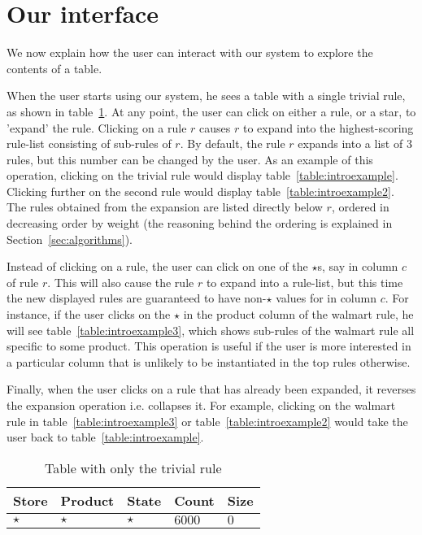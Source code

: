 \documentclass{sig-alternate}
\begin{document}
\section{Our interface}
\label{sec:interface}
We now explain how the user can interact with our system to explore the contents of a table. 

When the user starts using our system, he sees a table with a single trivial rule, as shown in table~\ref{table:trivial}. At any point, the user can click on either a rule, or a star, to 'expand' the rule. Clicking on a rule $r$ causes $r$ to expand into the highest-scoring rule-list consisting of sub-rules of $r$. By default, the rule $r$ expands into a list of $3$ rules, but this number can be changed by the user. As an example of this operation, clicking on the trivial rule would display table~\ref{table:introexample}. Clicking further on the second rule would display table~\ref{table:introexample2}. The rules obtained from the expansion are listed directly below $r$, ordered in decreasing order by weight (the reasoning behind the ordering is explained in Section~\ref{sec:algorithms}).

Instead of clicking on a rule, the user can click on one of the $\star$s, say in column $c$ of rule $r$. This will also cause the rule $r$ to expand into a rule-list, but this time the new displayed rules are guaranteed to have non-$\star$ values for in column $c$. For instance, if the user clicks on the $\star$ in the product column of the walmart rule, he will see table~\ref{table:introexample3}, which shows sub-rules of the walmart rule all specific to some product. This operation is useful if the user is more interested in a particular column that is unlikely to be instantiated in the top rules otherwise. 

Finally, when the user clicks on a rule that has already been expanded, it reverses the expansion operation i.e. collapses it. For example, clicking on the walmart rule in table~\ref{table:introexample3} or table~\ref{table:introexample2} would take the user back to table~\ref{table:introexample}.

\begin{table}
\centering
\begin{tabular}{| l | l | l | l | l |}
\hline Store & Product & State & Count & Size \\
\hline
$\star$ & $\star$ & $\star$ & $6000$ & $0$ \\ \hline
\end{tabular}
\caption{Table with only the trivial rule \label{table:trivial}}
\end{table}
	
\end{document}
